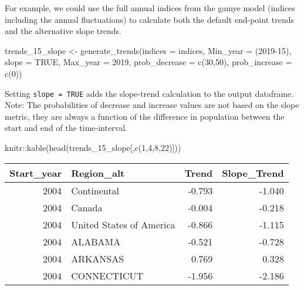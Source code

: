 \documentclass[
]{book}
\newenvironment{Shaded}{\begin{snugshade}}{\end{snugshade}}
\newcommand{\AttributeTok}[1]{\textcolor[rgb]{0.77,0.63,0.00}{#1}}
\newcommand{\ConstantTok}[1]{\textcolor[rgb]{0.00,0.00,0.00}{#1}}
\newcommand{\DecValTok}[1]{\textcolor[rgb]{0.00,0.00,0.81}{#1}}
\newcommand{\FunctionTok}[1]{\textcolor[rgb]{0.00,0.00,0.00}{#1}}
\newcommand{\NormalTok}[1]{#1}
\newcommand{\OtherTok}[1]{\textcolor[rgb]{0.56,0.35,0.01}{#1}}
\newcommand{\SpecialCharTok}[1]{\textcolor[rgb]{0.00,0.00,0.00}{#1}}
\begin{document}
For example, we could use the full annual indices from the gamye model (indices including the annual fluctuations) to calculate both the default end-point trends and the alternative slope trends.

\begin{Shaded}
\begin{Highlighting}[]
\NormalTok{trends\_15\_slope }\OtherTok{\textless{}{-}} \FunctionTok{generate\_trends}\NormalTok{(}\AttributeTok{indices =}\NormalTok{ indices,}
                          \AttributeTok{Min\_year =}\NormalTok{ (}\DecValTok{2019{-}15}\NormalTok{),}
                          \AttributeTok{slope =} \ConstantTok{TRUE}\NormalTok{,}
                          \AttributeTok{Max\_year =} \DecValTok{2019}\NormalTok{,}
                          \AttributeTok{prob\_decrease =} \FunctionTok{c}\NormalTok{(}\DecValTok{30}\NormalTok{,}\DecValTok{50}\NormalTok{),}
                          \AttributeTok{prob\_increase =} \FunctionTok{c}\NormalTok{(}\DecValTok{0}\NormalTok{))}
\end{Highlighting}
\end{Shaded}

Setting \texttt{slope\ =\ TRUE} adds the slope-trend calculation to the output dataframe.
Note: The probabilities of decrease and increase values are not based on the slope metric, they are always a function of the difference in population between the start and end of the time-interval.

\begin{Shaded}
\begin{Highlighting}[]
\NormalTok{knitr}\SpecialCharTok{::}\FunctionTok{kable}\NormalTok{(}\FunctionTok{head}\NormalTok{(trends\_15\_slope[,}\FunctionTok{c}\NormalTok{(}\DecValTok{1}\NormalTok{,}\DecValTok{4}\NormalTok{,}\DecValTok{8}\NormalTok{,}\DecValTok{22}\NormalTok{)]))}
\end{Highlighting}
\end{Shaded}

\begin{tabular}{r|l|r|r}
\hline
Start\_year & Region\_alt & Trend & Slope\_Trend\\
\hline
2004 & Continental & -0.793 & -1.040\\
\hline
2004 & Canada & -0.004 & -0.218\\
\hline
2004 & United States of America & -0.866 & -1.115\\
\hline
2004 & ALABAMA & -0.521 & -0.728\\
\hline
2004 & ARKANSAS & 0.769 & 0.328\\
\hline
2004 & CONNECTICUT & -1.956 & -2.186\\
\hline
\end{tabular}
\end{document}
